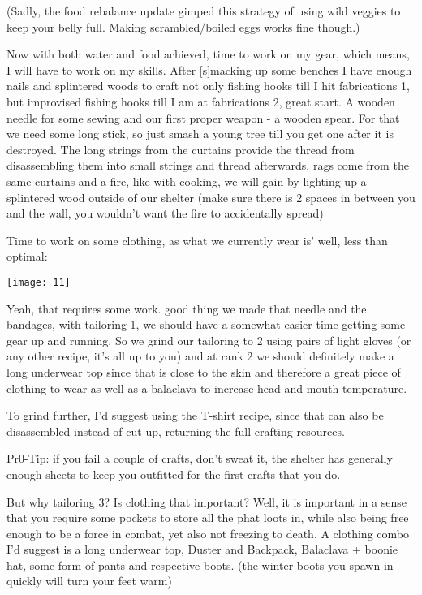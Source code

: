 (Sadly, the food rebalance update gimped this strategy of using wild veggies to keep your belly full. Making scrambled/boiled eggs works fine though.)

Now with both water and food achieved, time to work on my gear, which means, I will have to work on my skills. After [s]macking up some benches I have enough nails and splintered woods to craft not only fishing hooks till I hit fabrications 1, but improvised fishing hooks till I am at fabrications 2, great start. A wooden needle for some sewing and our first proper weapon - a wooden spear. For that we need some long stick, so just smash a young tree till you get one after it is destroyed. The long strings from the curtains provide the thread from disassembling them into small strings and thread afterwards, rags come from the same curtains and a fire, like with cooking, we will gain by lighting up a splintered wood outside of our shelter (make sure there is 2 spaces in between you and the wall, you wouldn't want the fire to accidentally spread)

Time to work on some clothing, as what we currently wear is' well, less than optimal:

\begin{center}
\texttt{[image: 11]}
\end{center}

Yeah, that requires some work. good thing we made that needle and the bandages, with tailoring 1, we should have a somewhat easier time getting some gear up and running. So we grind our tailoring to 2 using pairs of light gloves (or any other recipe, it's all up to you) and at rank 2 we should definitely  make a long underwear top since that is close to the skin and therefore a great piece of clothing to wear as well as a balaclava to increase head and mouth temperature.

To grind further, I'd suggest using the T-shirt recipe, since that can also be disassembled instead of cut up, returning the full crafting resources.

Pr0-Tip: if you fail a couple of crafts, don't sweat it, the shelter has generally enough sheets to keep you outfitted for the first crafts that you do.

But why tailoring 3? Is clothing that important? Well, it is important in a sense that you require some pockets to store all the phat loots in, while also being free enough to be a force in combat, yet also not freezing to death. A clothing combo I'd suggest is a long underwear top, Duster and Backpack, Balaclava + boonie hat, some form of pants and respective boots. (the winter boots you spawn in quickly will turn your feet warm)

